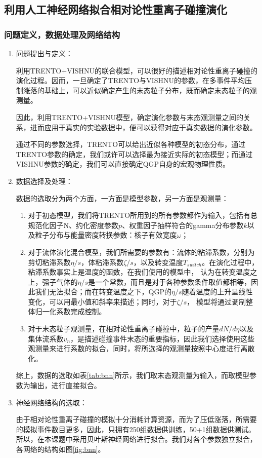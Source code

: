 \documentclass[aps,pre,12pt,preprint,onecolumn,showpacs,showkeys]{revtex4-1}
\begin{document}
\subsection{利用人工神经网络拟合相对论性重离子碰撞演化}
\subsubsection{问题定义，数据处理及网络结构}
\begin{enumerate}
    \item 问题提出与定义：\par
    利用TRENTO+VISHNU的联合模型，可以很好的描述相对论性重离子碰撞的演化过程。因而，一旦确定了TRENTO与VISHNU的参数，在多事件平均压制涨落的基础上，可以近似确定产生的末态粒子分布，既而确定末态粒子的观测量。\par
因此，利用TRENTO+VISHNU模型，确定演化参数与末态观测量之间的关系，进而应用于真实的实验数据中，便可以获得对应于真实数据的演化参数。\par
通过不同的参数选择，TRENTO可以给出近似各种模型的初态分布，通过TRENTO参数的确定，我们或许可以选择最为接近实际的初态模型；而通过VISHNU参数的确定，我们可以直接确定QGP自身的宏观物理性质。\par
    \item 数据选择及处理：\par
    数据的选取分为两个方面，一方面是模型参数，另一方面是观测量：
    \begin{enumerate}
        \item 对于初态模型，我们将TRENTO所用到的所有参数都作为输入，包括有总规范化因子$\mathrm{N}$、约化密度参数$p$、权重因子抽样符合的gamma分布参数$k$以及粒子分布与能量密度转换参数：核子有效宽度$\omega$；
        \item 对于流体演化混合模型，我们所需要的参数有：流体的粘滞系数，分别为剪切粘滞系数$\eta/s$，体粘滞系数$\zeta/s$，以及转变温度$T_{switch}$。在演化过程中，粘滞系数事实上是温度的函数，在我们使用的模型中，
        认为在转变温度之上，强子气体的$\eta/s$是一个常数，而且是对于各种参数条件取值都相等，因此我们无法拟合；而在转变温度之下，QGP的$\eta/s$随着温度的上升呈线性变化，可以用最小值和斜率来描述；同时，对于$\zeta/s$，
        模型将通过调制整体归一化系数完成控制。
        \item 对于末态粒子观测量，在相对论性重离子碰撞中，粒子的产量$dN/d\eta$以及集体流系数$v_n$，是描述碰撞事件末态的重要指标，因此我们选择使用这些观测量来进行系数的拟合，同时，将所选择的观测量按照中心度进行离散化。\par
    \end{enumerate}
    综上，数据的选取如表\ref{tab:bnn}所示，我们取末态观测量为输入，而取模型参数为输出，进行直接拟合。
    \item 神经网络结构的选取：\par
    由于相对论性重离子碰撞的模拟十分消耗计算资源，而为了压低涨落，所需要的模拟事件数目更多，因此，只拥有250组数据供训练，50+1组数据供测试。所以，在本课题中采用贝叶斯神经网络进行拟合。我们对各个参数独立拟合，各网络的结构如图\ref{fig:bnn}。    
\end{enumerate}
\end{document}
